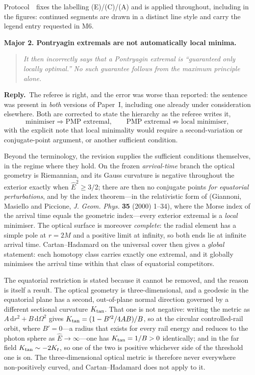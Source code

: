 \documentclass[11pt]{article}
\newenvironment{referee}
  {\begin{quote}\itshape\small}
  {\end{quote}}
\newcommand{\reply}{\par\noindent\textbf{Reply.}\ }
\newcommand{\dd}{\mathrm{d}}
\newcommand{\R}[1]{\par\medskip\noindent\textbf{#1}\par\nopagebreak}
\begin{document}
Protocol~\msProtStatus\ fixes the labelling (E)/(C)/(A) and is applied throughout, including
in the figures: continued segments are drawn in a distinct line style and carry the
legend entry requested in M6.

\R{Major 2. Pontryagin extremals are not automatically local minima.}

\begin{referee}
It then incorrectly says that a Pontryagin extremal is ``guaranteed only locally
optimal.'' No such guarantee follows from the maximum principle alone.
\end{referee}

\reply The referee is right, and the error was worse than reported: the sentence
was present in \emph{both} versions of Paper~I, including one already under
consideration elsewhere. Both are corrected to state the hierarchy as the referee
writes it,
\[
  \text{minimiser}\Longrightarrow\text{PMP extremal},
  \qquad
  \text{PMP extremal}\not\Longrightarrow\text{local minimiser},
\]
with the explicit note that local minimality would require a second-variation or
conjugate-point argument, or another sufficient condition.

Beyond the terminology, the revision supplies the sufficient conditions
themselves, in the regime where they hold. On the frozen \emph{arrival-time} branch the
optical geometry is Riemannian, and its Gauss curvature is negative throughout
the exterior exactly when $\hat E^2\ge3/2$; there are then no conjugate points
\emph{for equatorial perturbations},
and by the index theorem---in the relativistic form of
(Giannoni, Masiello and Piccione, \emph{J. Geom. Phys.} \textbf{35} (2000) 1--34), where the Morse index of the arrival time
equals the geometric index---every exterior extremal is a \emph{local} minimiser.
The optical surface is moreover \emph{complete}: the radial element has a simple
pole at $r=2M$ and a positive limit at infinity, so both ends lie at infinite
arrival time. Cartan--Hadamard on the universal cover then gives a \emph{global}
statement: each homotopy class carries exactly one extremal, and it globally
minimises the arrival time within that class of equatorial competitors.

The equatorial restriction is stated because it cannot be removed, and the
reason is itself a result. The optical geometry is three-dimensional, and a
geodesic in the equatorial plane has a second, out-of-plane normal direction
governed by a different sectional curvature $K_{\rm tan}$. That one is not
negative: writing the metric as $A\,\dd r^2+B\,\dd\Omega^2$ gives
$K_{\rm tan}=(1-B'^2/4AB)/B$, so at the circular controlled-rail orbit, where
$B'=0$---a radius that exists for every rail energy and reduces to the photon
sphere as $\hat E\to\infty$---one has $K_{\rm tan}=1/B>0$ identically; and in the
far field $K_{\rm tan}\sim-2K_t$, so one of the two is positive whichever side of
the threshold one is on. The three-dimensional optical metric is therefore never
everywhere non-positively curved, and Cartan--Hadamard does not apply to it.
\end{document}
